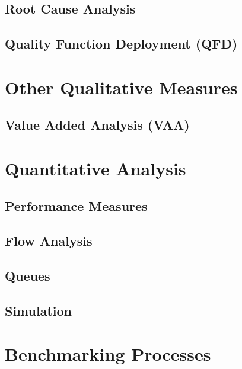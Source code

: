 \subsection{Root Cause Analysis}
\subsection{Quality Function Deployment (QFD)}

\section{Other Qualitative Measures}

\subsection{Value Added Analysis (VAA)}

\section{Quantitative Analysis}
\subsection{Performance Measures}
\subsection{Flow Analysis}
\subsection{Queues}
\subsection{Simulation}

\section{Benchmarking Processes}

